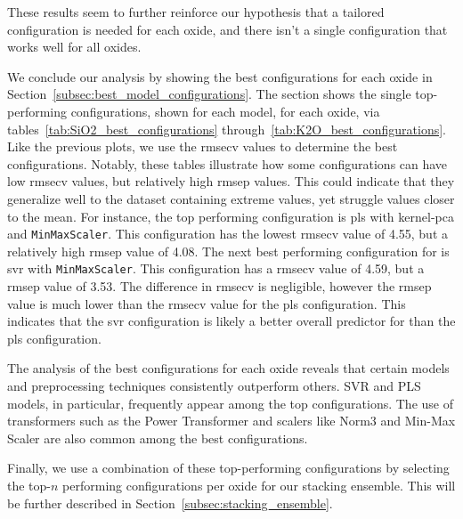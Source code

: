 These results seem to further reinforce our hypothesis that a tailored configuration is needed for each oxide, and there isn't a single configuration that works well for all oxides.



We conclude our analysis by showing the best configurations for each oxide in Section~\ref{subsec:best_model_configurations}.
The section shows the single top-performing configurations, shown for each model, for each oxide, via tables~\ref{tab:SiO2_best_configurations} through~\ref{tab:K2O_best_configurations}.
Like the previous plots, we use the \gls{rmsecv} values to determine the best configurations.
Notably, these tables illustrate how some configurations can have low \gls{rmsecv} values, but relatively high \gls{rmsep} values.
This could indicate that they generalize well to the dataset containing extreme values, yet struggle values closer to the mean.
For instance, the top performing  configuration is \gls{pls} with \gls{kernel-pca} and \texttt{MinMaxScaler}.
This configuration has the lowest \gls{rmsecv} value of 4.55, but a relatively high \gls{rmsep} value of 4.08.
The next best performing configuration for  is \gls{svr} with \texttt{MinMaxScaler}.
This configuration has a \gls{rmsecv} value of 4.59, but a \gls{rmsep} value of 3.53.
The difference in \gls{rmsecv} is negligible, however the \gls{rmsep} value is much lower than the \gls{rmsecv} value for the \gls{pls} configuration.
This indicates that the \gls{svr} configuration is likely a better overall predictor for  than the \gls{pls} configuration.

The analysis of the best configurations for each oxide reveals that certain models and preprocessing techniques consistently outperform others. SVR and PLS models, in particular, frequently appear among the top configurations. The use of transformers such as the Power Transformer and scalers like Norm3 and Min-Max Scaler are also common among the best configurations.

Finally, we use a combination of these top-performing configurations by selecting the top-$n$ performing configurations per oxide for our stacking ensemble.
This will be further described in Section~\ref{subsec:stacking_ensemble}.